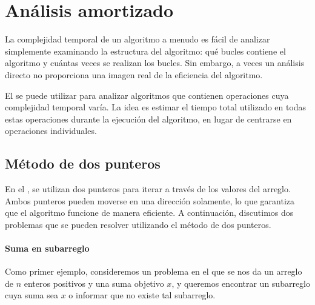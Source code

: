\chapter{Análisis amortizado}


La complejidad temporal de un algoritmo
a menudo es fácil de analizar
simplemente examinando la estructura
del algoritmo:
qué bucles contiene el algoritmo
y cuántas veces se realizan los bucles.
Sin embargo, a veces un análisis directo
no proporciona una imagen real de la eficiencia del algoritmo.

El  se puede utilizar para analizar
algoritmos que contienen operaciones cuya
complejidad temporal varía.
La idea es estimar el tiempo total utilizado en
todas estas operaciones durante la
ejecución del algoritmo, en lugar de centrarse
en operaciones individuales.

\section{Método de dos punteros}


En el ,
se utilizan dos punteros para
iterar a través de los valores del arreglo.
Ambos punteros pueden moverse en una dirección solamente,
lo que garantiza que el algoritmo funcione de manera eficiente.
A continuación, discutimos dos problemas que se pueden resolver
utilizando el método de dos punteros.

\subsubsection{Suma en subarreglo}

Como primer ejemplo,
consideremos un problema en el que se nos da
un arreglo de $n$ enteros positivos
y una suma objetivo $x$,
y queremos encontrar un subarreglo cuya suma sea $x$
o informar que no existe tal subarreglo.

